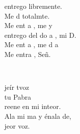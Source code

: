 \documentclass[12pt]{article}
\begin{document}
\begin{multicols*}{2}
\begin{cancion}
	\begin{chorus}%
	 entrego libremente.  \\
	Me d totalmte.  \\
	Me ent a , me y   \\
	 entrego del do a , mi D.  \\
	Me ent a , me d a \\
	Me entra , Señ. \\
	\end{chorus}%
	\jump\\
\end{cancion}%

\begin{cancion}%
	jeír tvoz\\
	 tu Pabra \\
	reene en mi inteor.\\
	Ala mi ma y énala de,\\
	jeor voz.\\
\end{cancion}%


\end{multicols*}
\end{document}
